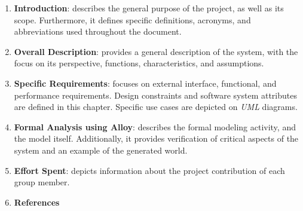 \begin{enumerate}
    \item \textbf{Introduction}: describes the general purpose of the project, as well as its scope. Furthermore, it defines specific definitions, acronyms, and abbreviations used throughout the document.
    \item \textbf{Overall Description}: provides a general description of the system, with the focus on its perspective, functions, characteristics, and assumptions.
    \item \textbf{Specific Requirements}: focuses on external interface, functional, and performance requirements. Design constraints and software system attributes are defined in this chapter. Specific use cases are depicted on \textit{UML} diagrams.
    \item \textbf{Formal Analysis using Alloy}: describes the formal modeling activity, and the model itself. Additionally, it provides verification of critical aspects of the system and an example of the generated world.
    \item \textbf{Effort Spent}: depicts information about the project contribution of each group member.
    \item \textbf{References}
\end{enumerate}
